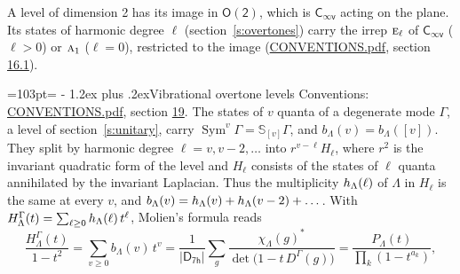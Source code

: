 \documentclass[10pt,a4paper]{article}
\makeatletter
\renewcommand\section{\@startsection{section}{1}{\z@}{-3ex plus -1ex minus -.2ex}%
  {1.2ex plus .2ex}{\normalfont\large\sffamily\bfseries\color{parttitle}}}
\newcommand{\needspace}[1]{\par\penalty-100\begingroup\dimen0=#1\relax\dimen2=\pagegoal
  \advance\dimen2-\pagetotal\ifdim\dimen0>\dimen2\relax\ifdim\dimen2>0pt\vfil\break\fi\fi
  \endgroup}
\numberwithin{equation}{section}
\newcommand{\grp}[1]{\mathsf{#1}}
\newcommand{\irr}[1]{\text{\normalfont\scshape #1}}
\newcommand{\repD}[1]{D^{#1}}
\newcommand{\irchar}[1]{\chi_{#1}}
\newcommand{\conj}[1]{{#1}^{*}}
\newcommand{\schur}[1]{\mathbb{S}_{#1}}
\newcommand{\shape}[1]{[#1]}
\makeatother
\begin{document}
A level of dimension 2 has its image in $\grp{O(2)}$, which is \href{Cinfv.pdf}{$\grp{C_{\infty v}}$} acting on the plane. \label{n:index.harmonic.degree}Its states of harmonic degree $\ell$ (section~\ref{s:overtones}) carry the irrep $\irr{e}_{\ell}$ of \href{Cinfv.pdf}{$\grp{C_{\infty v}}$} ($\ell > 0$) or $\irr{a}_{1}$ ($\ell = 0$), restricted to the image (\href{../../CONVENTIONS.pdf}{CONVENTIONS.pdf}, section \href{../../CONVENTIONS.pdf\#conv.16.1}{16.1}).
\needspace{103pt}
\section{Vibrational overtone levels}\label{s:overtones}
Conventions: \href{../../CONVENTIONS.pdf}{CONVENTIONS.pdf}, section \href{../../CONVENTIONS.pdf\#conv.19}{19}.
\leavevmode\label{n:index.quanta}\label{n:operator.symmetric.power}The states of $v$ quanta of a degenerate mode $\Gamma$, a level of section~\ref{s:unitary}, carry $\operatorname{Sym}^{v}\Gamma = \schur{\shape{v}}\Gamma$, and $b_\Lambda(v) = b_\Lambda(\shape{v})$. \label{n:local.quadratic.form}\label{n:set.harmonic}They split by harmonic degree $\ell = v, v - 2, \dots$ into $r^{v-\ell}H_\ell$, where $r^2$ is the invariant quadratic form of the level and $H_\ell$ consists of the states of $\ell$ quanta annihilated by the invariant Laplacian. \label{n:function.multiplicity.harmonic}Thus the multiplicity $\mathnormal{h}_\Lambda(\ell)$ of $\Lambda$ in $H_\ell$ is the same at every $v$, and $b_\Lambda(v) = \mathnormal{h}_\Lambda(v) + \mathnormal{h}_\Lambda(v - 2) + \dots$. \label{n:function.generating.level}With $H^{\Gamma}_\Lambda(t) = \sum_{\ell\ge0} \mathnormal{h}_\Lambda(\ell)\,t^{\ell}$, Molien's formula reads
\begin{equation}\label{e:molien}\frac{H^{\Gamma}_\Lambda(t)}{1 - t^2} = \sum_{v\ge0} b_\Lambda(v)\,t^v = \frac{1}{|\grp{D_{7h}}|}\sum_{g}\frac{\conj{\irchar{\Lambda}(g)}}{\det\bigl(1 - t\,\repD{\Gamma}(g)\bigr)} = \frac{P_\Lambda(t)}{\prod_k (1-t^{a_k})},\end{equation}
\end{document}
